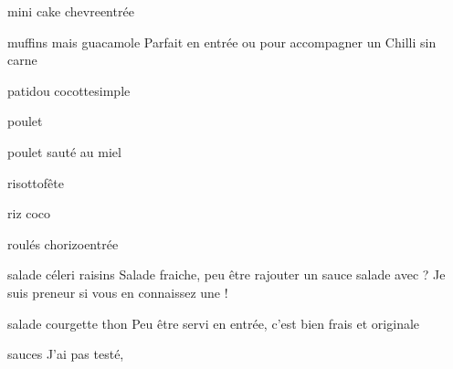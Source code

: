 	\begin{recette}{mini cake chevre}{entrée}
	\end{recette}
	
	\begin{recette}{muffins mais guacamole}{}
		Parfait en entrée ou pour accompagner un Chilli sin carne
	\end{recette}
	
	\begin{recette}{patidou cocotte}{simple}
	\end{recette}
	
	\begin{recette}{poulet}{}
	\end{recette}
	
	\begin{recette}{poulet sauté au miel}{}
	\end{recette}
	
	\begin{recette}{risotto}{fête}
	\end{recette}
	
	\begin{recette}{riz coco}{}
	\end{recette}
	
	\begin{recette}{roulés chorizo}{entrée}
	\end{recette}
	
	\begin{recette}{\heart salade céleri raisins}{}
		Salade fraiche, peu être rajouter un sauce salade avec ? Je suis preneur si vous en connaissez une !
	\end{recette}
	
	\begin{recette}{salade courgette thon}{}
		Peu être servi en entrée, c'est bien frais et originale 
	\end{recette}
	
	\begin{recette}{sauces}{}
		J'ai pas testé,
	\end{recette}
	
